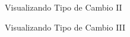 \documentclass{IFFranciscoME}\usepackage[]{graphicx}\usepackage[]{color}
\begin{document}

\begin{frame}{Visualizando Tipo de Cambio II}

\end{frame}


\begin{frame}{Visualizando Tipo de Cambio III}





\end{frame}
\end{document}
